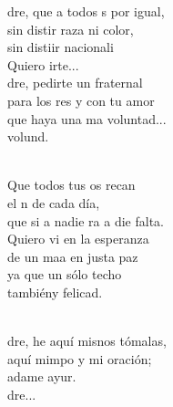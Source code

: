 \documentclass[12pt]{article}
\begin{document}
\begin{multicols*}{2}
\begin{cancion}%
	dre, que a todos s por igual,\\
	sin distir raza ni color,\\
	sin distiir nacionali\\
	Quiero irte...\\
	dre, pedirte un fraternal \\
	para los res y con tu amor\\
	que haya una ma voluntad...\\
	 volund. \\\jump\\
	\begin{chorus}%
	Que todos tus os recan\\
	el n de cada día,\\
	que si a nadie ra a die falta. \\
	Quiero vi en la esperanza\\
	de un maa en justa paz\\
	ya que  un sólo techo\\
	tambiény felicad.\\
	\end{chorus}%
	\jump\\
	dre, he aquí misnos tómalas,\\
	aquí mimpo y mi oración;\\
	adame ayur.  \\
	dre...\\
\end{cancion}%


\end{multicols*}
\end{document}
